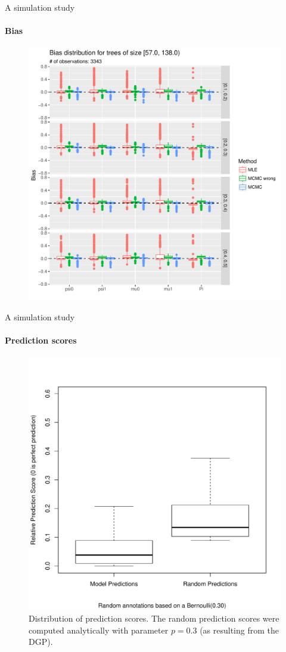 \documentclass[9pt,handout,ignorenonframetext,]{beamer}
\begin{document}
\begin{frame}[t]{A simulation study}

\framesubtitle{Bias}

\begin{figure}
\centering
\includegraphics[width=.68\linewidth]{bias_trees_of_size_[57,138).pdf}
\end{figure}

\end{frame}

\begin{frame}[t]{A simulation study}

\framesubtitle{Prediction scores}

\begin{figure}
\centering
\includegraphics[width=.6\linewidth, trim = {0 1cm 0 2cm}, clip]{mcmc_right_prior_prediction.pdf}
\caption{Distribution of prediction scores. The random prediction scores were computed analytically with parameter $p=0.3$ (as resulting from the DGP).}
\end{figure}

\end{frame}
\end{document}
